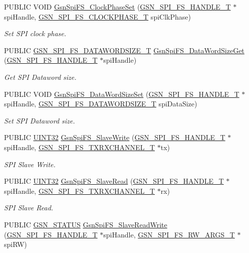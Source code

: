 \begin{DoxyCompactItemize}
PUBLIC VOID \hyperlink{a00655_gadd121e79eb181b9fd6ef2d891d6e7fe0}{GsnSpiFS\_\-ClockPhaseSet} (\hyperlink{a00234}{GSN\_\-SPI\_\-FS\_\-HANDLE\_\-T} $\ast$spiHandle, \hyperlink{a00655_gaf3bb2adb7491e3d235c486d48f1b506d}{GSN\_\-SPI\_\-FS\_\-CLOCKPHASE\_\-T} spiClkPhase)
\begin{DoxyCompactList}\small\item\em Set SPI clock phase. \end{DoxyCompactList}\item 
PUBLIC \hyperlink{a00655_gaad2f137ab7bba85003348a4b895e435d}{GSN\_\-SPI\_\-FS\_\-DATAWORDSIZE\_\-T} \hyperlink{a00655_ga4d6382b7b36a7734dc9d928ca0d78914}{GsnSpiFS\_\-DataWordSizeGet} (\hyperlink{a00234}{GSN\_\-SPI\_\-FS\_\-HANDLE\_\-T} $\ast$spiHandle)
\begin{DoxyCompactList}\small\item\em Get SPI Dataword size. \end{DoxyCompactList}\item 
PUBLIC VOID \hyperlink{a00655_gaf3726da0e724d957640dccf06690dcb5}{GsnSpiFS\_\-DataWordSizeSet} (\hyperlink{a00234}{GSN\_\-SPI\_\-FS\_\-HANDLE\_\-T} $\ast$spiHandle, \hyperlink{a00655_gaad2f137ab7bba85003348a4b895e435d}{GSN\_\-SPI\_\-FS\_\-DATAWORDSIZE\_\-T} spiDataSize)
\begin{DoxyCompactList}\small\item\em Set SPI Dataword size. \end{DoxyCompactList}\item 
PUBLIC \hyperlink{a00660_gae1e6edbbc26d6fbc71a90190d0266018}{UINT32} \hyperlink{a00655_ga08002b3f127d297a7cf861236e16b5d2}{GsnSpiFS\_\-SlaveWrite} (\hyperlink{a00234}{GSN\_\-SPI\_\-FS\_\-HANDLE\_\-T} $\ast$spiHandle, \hyperlink{a00237}{GSN\_\-SPI\_\-FS\_\-TXRXCHANNEL\_\-T} $\ast$tx)
\begin{DoxyCompactList}\small\item\em SPI Slave Write. \end{DoxyCompactList}\item 
PUBLIC \hyperlink{a00660_gae1e6edbbc26d6fbc71a90190d0266018}{UINT32} \hyperlink{a00655_ga9150e0bedd31d99fc844282242e4d844}{GsnSpiFS\_\-SlaveRead} (\hyperlink{a00234}{GSN\_\-SPI\_\-FS\_\-HANDLE\_\-T} $\ast$spiHandle, \hyperlink{a00237}{GSN\_\-SPI\_\-FS\_\-TXRXCHANNEL\_\-T} $\ast$rx)
\begin{DoxyCompactList}\small\item\em SPI Slave Read. \end{DoxyCompactList}\item 
PUBLIC \hyperlink{a00660_gada5951904ac6110b1fa95e51a9ddc217}{GSN\_\-STATUS} \hyperlink{a00655_gad34396a6807c38a140af6fbf0cdd1bc4}{GsnSpiFS\_\-SlaveReadWrite} (\hyperlink{a00234}{GSN\_\-SPI\_\-FS\_\-HANDLE\_\-T} $\ast$spiHandle, \hyperlink{a00235}{GSN\_\-SPI\_\-FS\_\-RW\_\-ARGS\_\-T} $\ast$spiRW)

\end{DoxyCompactItemize}
